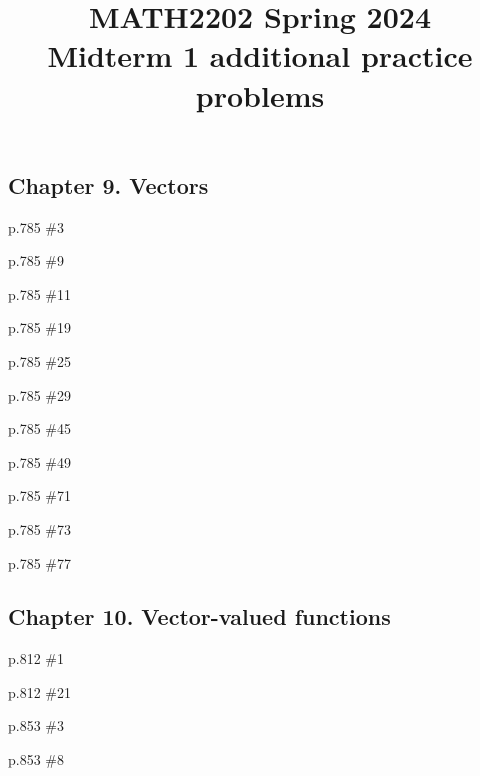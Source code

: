 \documentclass[11pt,oneside]{amsart}
\title{MATH2202 Spring 2024\\
Midterm 1 additional practice problems}
\theoremstyle{definition}
\begin{document}
\maketitle

\subsection*{Chapter 9. Vectors}
\begin{practice}p.785 \#3\end{practice}
\begin{practice}p.785 \#9\end{practice}
\begin{practice}p.785 \#11\end{practice}
\begin{practice}p.785 \#19\end{practice}
\begin{practice}p.785 \#25\end{practice}
\begin{practice}p.785 \#29\end{practice}
\begin{practice}p.785 \#45\end{practice}
\begin{practice}p.785 \#49\end{practice}
\begin{practice}p.785 \#71\end{practice}
\begin{practice}p.785 \#73\end{practice}
\begin{practice}p.785 \#77\end{practice}

\subsection*{Chapter 10. Vector-valued functions}
\begin{practice}p.812 \#1\end{practice}
\begin{practice}p.812 \#21\end{practice}
\begin{practice}p.853 \#3\end{practice}
\begin{practice}p.853 \#8\end{practice}
\end{document}
